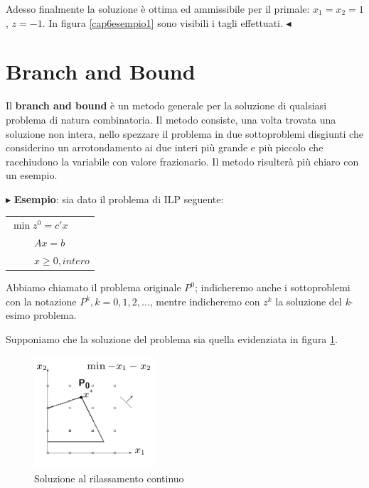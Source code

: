 \documentclass[11pt]{book}
\begin{document}
Adesso finalmente la soluzione \`e ottima ed ammissibile per il
primale: $x_1 = x_2 = 1$, $z = -1$. In figura \ref{cap6esempio1} sono
visibili i tagli effettuati. $\blacktriangleleft$
\vspace{11pt}

\section{Branch and Bound}

Il {\bf branch and bound} \`e un metodo generale per la soluzione di
qualsiasi problema di natura combinatoria. Il metodo consiste, una
volta trovata una soluzione non intera, nello spezzare il problema in
due sottoproblemi disgiunti che considerino un arrotondamento ai due
interi pi\`u grande e pi\`u piccolo che racchiudono la variabile con
valore frazionario. Il metodo risulter\`a pi\`u chiaro con un esempio.

\vspace{11pt}
$\blacktriangleright$ {\bf Esempio}: sia dato il problema di ILP
seguente:

\vspace{11pt}
\begin{center}
\begin{tabular}{l}
$\min z^0 = c'x$ \\
$\phantom{mina}Ax= b$ \\
$\phantom{mina}x\geq 0, intero$ \\
\end{tabular}
\end{center}
\vspace{11pt}

Abbiamo chiamato il problema originale $P^0$; indicheremo anche i
sottoproblemi con la notazione $P^k, k = 0,1,2,\dots$, mentre
indicheremo con $z^k$ la soluzione del {\em k}-esimo problema.

Supponiamo che la soluzione del problema sia quella evidenziata in
figura \ref{cap6fig66}.

\begin{figure}[h!]
  \centering
  \includegraphics[width=0.4\textwidth]{images/cap6fig66.png}
  \caption{Soluzione al rilassamento continuo}
  \label{cap6fig66}
\end{figure}
\end{document}
